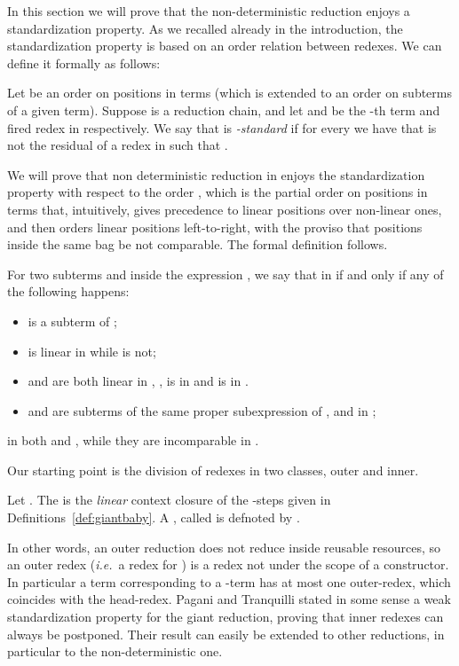 In this section we will prove that the non-deterministic reduction enjoys a standardization property.
As we recalled already in the introduction, the standardization property is based on an order relation between redexes.
We can define it formally as follows:
\begin{definition}
Let  be an order on positions in terms (which is extended to an order on
subterms of a given term). Suppose  is a reduction chain, and let
 and  be the -th term and fired redex in  respectively.
We say that  is \emph{-standard} if for every  we have that
 is not the residual of a redex  in  such that .
\end{definition}

We will prove that non deterministic reduction in  enjoys the standardization property
with respect to the order , which is the partial order on positions in  terms that, intuitively,
gives precedence to linear positions over non-linear ones, and then orders
linear positions left-to-right, with the proviso that positions inside the same bag
be not comparable. The formal definition follows.

\begin{definition}\label{def:order}
For two subterms  and  inside the expression , we say that
 in  if and only if any of the following happens:
\begin{itemize}
 \item  is a subterm of ;
 \item  is linear in  while  is not;
 \item  and  are both linear in , ,  is in  and  is in .
 \item  and  are subterms of the same proper subexpression  of , and
  in ;
\end{itemize}
\end{definition}
\begin{example}
  in both  and
 ,
 while they are incomparable in .
\end{example}

Our starting point is the division of redexes in two classes, outer and inner.

\begin{definition}\label{def:outerreduction}
Let . The   is the 
 \emph{linear} context closure of the -steps given in
Definitions~\ref{def:giantbaby}. 
A , called  is
defnoted by .
\end{definition}
In other words, an outer reduction does not reduce inside reusable resources, so
an outer redex (\emph{i.e.}\ a redex for ) is a redex not under the scope of a 
 constructor. In particular a term corresponding to a 
-term has at most one outer-redex, which coincides with the head-redex.
Pagani and Tranquilli stated in some sense a weak standardization property for the giant reduction,
proving that inner redexes can always be postponed. Their result
can easily be extended to other reductions, in particular to the non-deterministic one.

